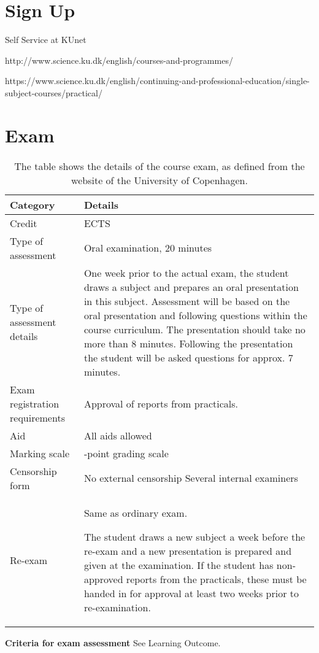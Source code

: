 \section{Sign Up}
Self Service at KUnet

http://www.science.ku.dk/english/courses-and-programmes/

https://www.science.ku.dk/english/continuing-and-professional-education/single-subject-courses/practical/

\section{Exam}
\begin{table}[h]
    \centering
    \caption{The table shows the details of the course exam, as defined from the website of the University of Copenhagen.}
    \label{tab:course_details}
    \begin{tabular}{ l | >{\raggedright\arraybackslash}p{\textwidth - 5.8cm} }
        \textbf{Category} & \textbf{Details} \\ 
        \hline
        Credit & 7.5 ECTS \\ 

        Type of assessment & Oral examination, 20 minutes \\ 

        Type of assessment details & One week prior to the actual exam, the student draws a subject and prepares an oral presentation in this subject. Assessment will be based on the oral presentation and following questions within the course curriculum. The presentation should take no more than 8 minutes. Following the presentation the student will be asked questions for approx. 7 minutes. \\ 

        Exam registration requirements & Approval of reports from practicals. \\ 

        Aid & All aids allowed \\ 

        Marking scale & 7-point grading scale \\ 

        Censorship form & No external censorship
        Several internal examiners \\ 

        Re-exam & Same as ordinary exam.

        The student draws a new subject a week before the re-exam and a new presentation is prepared and given at the examination. If the student has non-approved reports from the practicals, these must be handed in for approval at least two weeks prior to re-examination. \\ 
    \end{tabular}
\end{table}

\textbf{Criteria for exam assessment}
See Learning Outcome.
